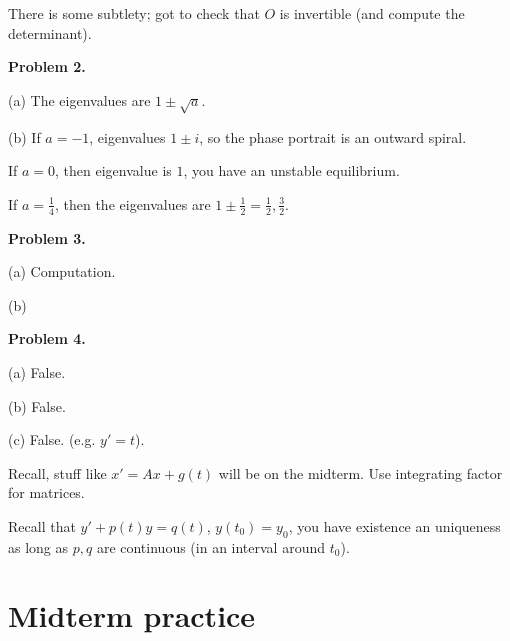 \documentclass{article}
\begin{document}
There is some subtlety; got to check that $O$ is invertible (and compute the determinant).

{\bf Problem 2.}

(a) The eigenvalues are $1 \pm \sqrt{a}$.

(b) If $a = -1$, eigenvalues $1 \pm i$, so the phase portrait is an outward spiral.

If $a = 0$, then eigenvalue is $1$, you have an unstable equilibrium.

If $a = \frac{1}{4}$, then the eigenvalues are $1 \pm \frac{1}{2} = \frac{1}{2}, \frac{3}{2}$.

{\bf Problem 3.}

(a) Computation.

(b) 

{\bf Problem 4.}

(a) False.

(b) False.

(c) False. (e.g. $y' = t$).

Recall, stuff like $x' = A x + g(t)$ will be on the midterm.  Use integrating factor for matrices.

Recall that $y' + p(t) y = q(t)$, $y(t_0) = y_0$, you have existence an uniqueness  as long as $p, q$ are continuous (in an interval around $t_0$).
 
\section{Midterm practice}
\end{document}
